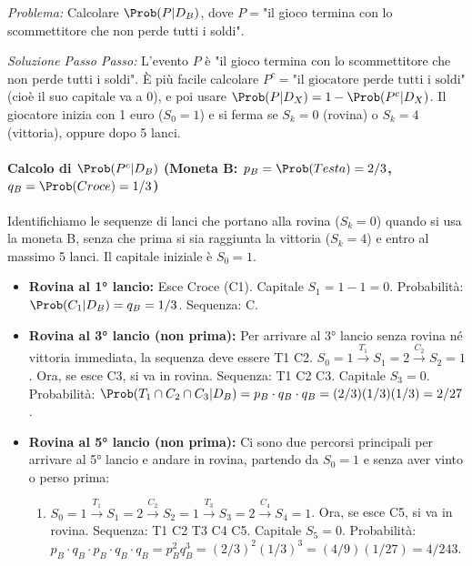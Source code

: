 \begin{example}\label{example:esercizio_1_punto_3}
\textit{Problema:} Calcolare $\Prob(P|D_B)$, dove $P = $"il gioco termina con lo scommettitore che non perde tutti i soldi".

\textit{Soluzione Passo Passo:}
L'evento $P$ è "il gioco termina con lo scommettitore che non perde tutti i soldi".
È più facile calcolare $P^c = \text{"il giocatore perde tutti i soldi"}$ (cioè il suo capitale va a 0), e poi usare $\Prob(P|D_X) = 1 - \Prob(P^c|D_X)$.
Il giocatore inizia con 1 euro ($S_0=1$) e si ferma se $S_k=0$ (rovina) o $S_k=4$ (vittoria), oppure dopo 5 lanci.

\paragraph{Calcolo di $\Prob(P^c|D_B)$ (Moneta B: $p_B = \Prob(Testa) = 2/3$, $q_B = \Prob(Croce) = 1/3$)}
Identifichiamo le sequenze di lanci che portano alla rovina ($S_k=0$) quando si usa la moneta B, senza che prima si sia raggiunta la vittoria ($S_k=4$) e entro al massimo 5 lanci.
Il capitale iniziale è $S_0=1$.

\begin{itemize}
    \item \textbf{Rovina al 1° lancio:}
    Esce Croce (C1). Capitale $S_1 = 1-1 = 0$.
    Probabilità: $\Prob(C_1|D_B) = q_B = 1/3$.
    Sequenza: C.

    \item \textbf{Rovina al 3° lancio (non prima):}
    Per arrivare al 3° lancio senza rovina né vittoria immediata, la sequenza deve essere T1 C2.
    $S_0=1 \xrightarrow{T_1} S_1=2 \xrightarrow{C_2} S_2=1$. Ora, se esce C3, si va in rovina.
    Sequenza: T1 C2 C3. Capitale $S_3=0$.
    Probabilità: $\Prob(T_1 \cap C_2 \cap C_3 | D_B) = p_B \cdot q_B \cdot q_B = (2/3)(1/3)(1/3) = 2/27$.

    \item \textbf{Rovina al 5° lancio (non prima):}
    Ci sono due percorsi principali per arrivare al 5° lancio e andare in rovina, partendo da $S_0=1$ e senza aver vinto o perso prima:
    \begin{enumerate}
        \item $S_0=1 \xrightarrow{T_1} S_1=2 \xrightarrow{C_2} S_2=1 \xrightarrow{T_3} S_3=2 \xrightarrow{C_4} S_4=1$. Ora, se esce C5, si va in rovina.
        Sequenza: T1 C2 T3 C4 C5. Capitale $S_5=0$.
        Probabilità: $p_B \cdot q_B \cdot p_B \cdot q_B \cdot q_B = p_B^2 q_B^3 = (2/3)^2 (1/3)^3 = (4/9)(1/27) = 4/243$.


\end{enumerate}
\end{itemize}
\end{example}
